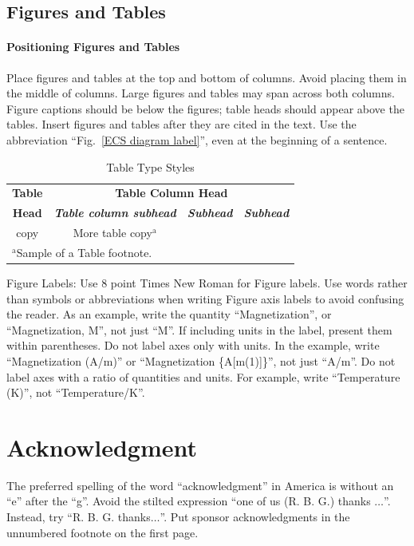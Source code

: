 \documentclass[conference]{IEEEtran}
\begin{document}
\subsection{Figures and Tables}
\paragraph{Positioning Figures and Tables} Place figures and tables at the top and 
bottom of columns. Avoid placing them in the middle of columns. Large 
figures and tables may span across both columns. Figure captions should be 
below the figures; table heads should appear above the tables. Insert 
figures and tables after they are cited in the text. Use the abbreviation 
``Fig.~\ref{ECS diagram label}'', even at the beginning of a sentence.

\begin{table}[htbp]
\caption{Table Type Styles}
\begin{center}
\begin{tabular}{|c|c|c|c|}
\hline
\textbf{Table}&\multicolumn{3}{|c|}{\textbf{Table Column Head}} \\
\cline{2-4} 
\textbf{Head} & \textbf{\textit{Table column subhead}}& \textbf{\textit{Subhead}}& \textbf{\textit{Subhead}} \\
\hline
copy& More table copy$^{\mathrm{a}}$& &  \\
\hline
\multicolumn{4}{l}{$^{\mathrm{a}}$Sample of a Table footnote.}
\end{tabular}
\label{tab1}
\end{center}
\end{table}

Figure Labels: Use 8 point Times New Roman for Figure labels. Use words 
rather than symbols or abbreviations when writing Figure axis labels to 
avoid confusing the reader. As an example, write the quantity 
``Magnetization'', or ``Magnetization, M'', not just ``M''. If including 
units in the label, present them within parentheses. Do not label axes only 
with units. In the example, write ``Magnetization (A/m)'' or ``Magnetization 
\{A[m(1)]\}'', not just ``A/m''. Do not label axes with a ratio of 
quantities and units. For example, write ``Temperature (K)'', not 
``Temperature/K''.

\section*{Acknowledgment}

The preferred spelling of the word ``acknowledgment'' in America is without 
an ``e'' after the ``g''. Avoid the stilted expression ``one of us (R. B. 
G.) thanks $\ldots$''. Instead, try ``R. B. G. thanks$\ldots$''. Put sponsor 
acknowledgments in the unnumbered footnote on the first page.
\end{document}
